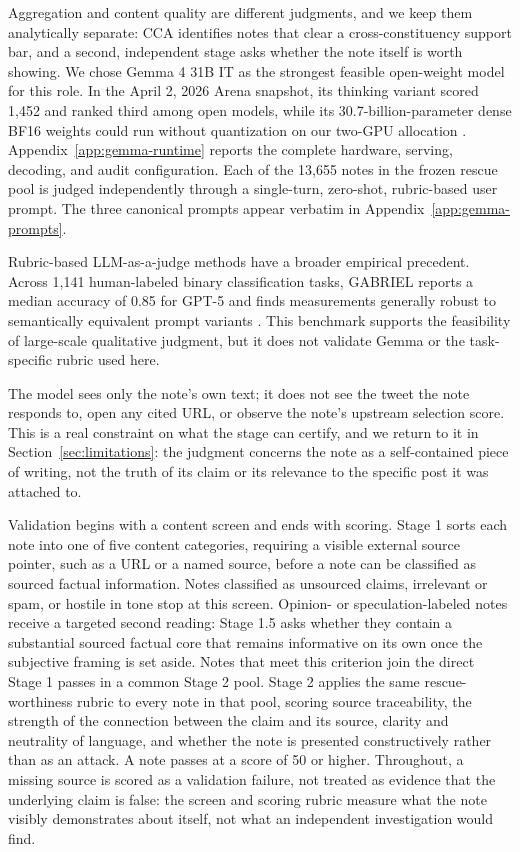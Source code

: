 \documentclass[10pt,twocolumn]{article}
\begin{document}
Aggregation and content quality are different judgments, and we keep them
analytically separate: CCA identifies notes that clear a cross-constituency
support bar, and a second, independent stage asks whether the note itself is
worth showing. We chose Gemma 4 31B IT as the strongest feasible open-weight
model for this role. In the April 2, 2026 Arena snapshot, its thinking variant
scored 1,452 and ranked third among open models, while its 30.7-billion-parameter
dense BF16 weights could run without quantization on our two-GPU allocation
\citep{arena2026leaderboard,google2026gemma4}. Appendix~\ref{app:gemma-runtime}
reports the complete hardware, serving, decoding, and audit configuration.
Each of the 13,655 notes in the frozen rescue pool is judged independently
through a single-turn, zero-shot, rubric-based user prompt. The three canonical
prompts appear verbatim in Appendix~\ref{app:gemma-prompts}.

Rubric-based LLM-as-a-judge methods have a broader empirical precedent. Across
1,141 human-labeled binary classification tasks, GABRIEL reports a median
accuracy of 0.85 for GPT-5 and finds measurements generally robust to
semantically equivalent prompt variants
\citep{asirvatham2026gptmeasurement}. This benchmark supports the feasibility
of large-scale qualitative judgment, but it does not validate Gemma or the
task-specific rubric used here.

The model sees only the note's own text; it does not see the tweet the note
responds to, open any cited URL, or observe the note's upstream selection
score. This is a real constraint on what the stage can certify, and we return
to it in Section~\ref{sec:limitations}: the judgment concerns the note as a
self-contained piece of writing, not the truth of its claim or its relevance
to the specific post it was attached to.

Validation begins with a content screen and ends with scoring. Stage 1 sorts
each note into one of five content categories, requiring a visible external
source pointer, such as a URL or a named source, before a note can be classified
as sourced factual information. Notes classified as unsourced claims,
irrelevant or spam, or hostile in tone stop at this screen. Opinion- or
speculation-labeled notes receive a targeted second reading: Stage 1.5 asks
whether they contain a substantial sourced factual core that remains
informative on its own once the subjective framing is set aside. Notes that
meet this criterion join the direct Stage 1 passes in a common Stage 2 pool.
Stage 2 applies the same rescue-worthiness rubric to every note in that pool,
scoring source traceability, the strength of the connection between the claim
and its source, clarity and neutrality of language, and whether the note is
presented constructively rather than as an attack. A note passes at a score of
50 or higher. Throughout, a missing source is scored as a validation failure,
not treated as evidence that the underlying claim is false: the screen and
scoring rubric measure what the note visibly demonstrates about itself, not
what an independent investigation would find.
\end{document}
